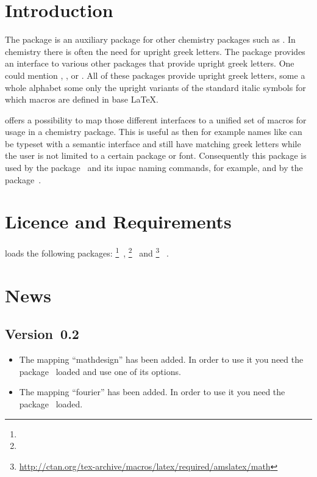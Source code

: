 \documentclass[load-preamble+]{cnltx-doc}
\begin{document}

\listoftables

\section{Introduction}
The \chemgreek{} package is an auxiliary package for other chemistry packages
such as .  In chemistry there is often the need for upright
greek letters.  The \chemgreek{} package provides an interface to various
other packages that provide upright greek letters.  One could mention
, ,  or .  All of these
packages provide upright greek letters, some a whole alphabet some only the
upright variants of the standard italic symbols for which macros are defined
in base \LaTeX.

\chemgreek{} offers a possibility to map those different interfaces to a
unified set of macros for usage in a chemistry package.  This is useful as
then for example names like  can be typeset
with a semantic interface and still have matching greek letters while the user
is not limited to a certain package or font.  Consequently this package is
used by the  package~\cite{pkg:chemmacros} and its \acs{iupac}
naming commands, for example, and by the 
package~\cite{pkg:chemnum}.

\section{Licence and Requirements}
\license

\chemgreek{} loads the following packages:
\footnote{}~\cite{bnd:l3kernel},
\footnote{}~\cite{bnd:l3packages} and
\footnote{\url{http://ctan.org/tex-archive/macros/latex/required/amslatex/math}}%
~\cite{pkg:amstext}.

\section{News}
\subsection{Version~0.2}
\begin{itemize}
  \item The mapping ``mathdesign'' has been added.  In order to use it you
    need the  package~\cite{pkg:mathdesign} loaded and use one
    of its options.
  \item The mapping ``fourier'' has been added.  In order to use it you
    need the  package~\cite{pkg:fourier} loaded.
\end{itemize}
\end{document}
